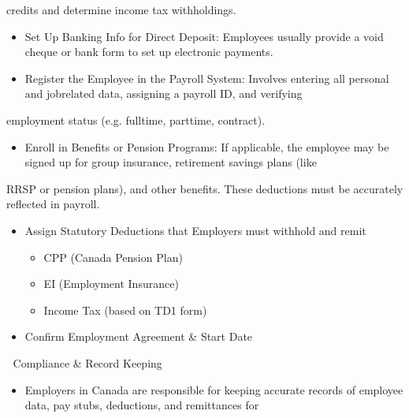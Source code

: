 \documentclass[letterpaper,10pt,english]{sphinxmanual}
\begin{document}
\sphinxAtStartPar
credits and determine income tax withholdings.
\begin{itemize}
\item {} 
\sphinxAtStartPar
Set Up Banking Info for Direct Deposit: Employees usually provide a void cheque or bank form to set up electronic payments.

\item {} 
\sphinxAtStartPar
Register the Employee in the Payroll System: Involves entering all personal and job\sphinxhyphen{}related data, assigning a payroll ID, and verifying

\end{itemize}

\sphinxAtStartPar
employment status (e.g. full\sphinxhyphen{}time, part\sphinxhyphen{}time, contract).
\begin{itemize}
\item {} 
\sphinxAtStartPar
Enroll in Benefits or Pension Programs: If applicable, the employee may be signed up for group insurance, retirement savings plans (like

\end{itemize}

\sphinxAtStartPar
RRSP or pension plans), and other benefits. These deductions must be accurately reflected in payroll.
\begin{itemize}
\item {} 
\sphinxAtStartPar
Assign Statutory Deductions that Employers must withhold and remit
\begin{itemize}
\item {} 
\sphinxAtStartPar
CPP (Canada Pension Plan)

\item {} 
\sphinxAtStartPar
EI (Employment Insurance)

\item {} 
\sphinxAtStartPar
Income Tax (based on TD1 form)

\end{itemize}

\item {} 
\sphinxAtStartPar
Confirm Employment Agreement \& Start Date

\end{itemize}

\sphinxAtStartPar
🍁 Compliance \& Record Keeping
\begin{itemize}
\item {} 
\sphinxAtStartPar
Employers in Canada are responsible for keeping accurate records of employee data, pay stubs, deductions, and remittances for

\end{itemize}
\end{document}
